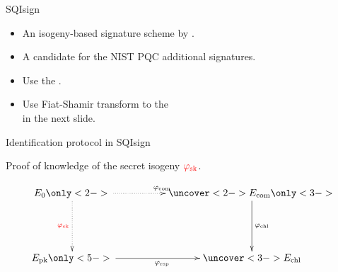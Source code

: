 \begin{frame}{SQIsign}
    \begin{itemize}
        \setlength{\itemsep}{10pt}
        \item An isogeny-based signature scheme by \cite{AC:DKLPW20}.
        \item A candidate for the NIST PQC additional signatures.
        \item Use the .
        \item Use Fiat-Shamir transform to the \\ in the next slide.
    \end{itemize}
\end{frame}

\begin{frame}{Identification protocol in SQIsign}
    \begin{center}
        Proof of knowledge of the secret isogeny $\textcolor{red}{\varphi_\mathrm{sk}}$.
    \end{center}

    \vspace{-10pt}
    
    {\large
    \begin{equation*}
        \xymatrix@C=50pt@R=50pt{
            E_0 \ar@{..>}[d]_{\red{\varphi_\mathrm{sk}}} \only<2->{\ar@{..>}[r]^{\varphi_{\mathrm{com}}}}
                & \uncover<2->{E_{\mathrm{com}}} \only<3->{\ar[d]^{\varphi_\mathrm{chl}}}\\
            E_{\mathrm{pk}} \only<5->{\ar[r]_{\varphi_\mathrm{rsp}}} & \uncover<3->{E_{\mathrm{chl}}}
        }
    \end{equation*}
    }


\end{frame}

